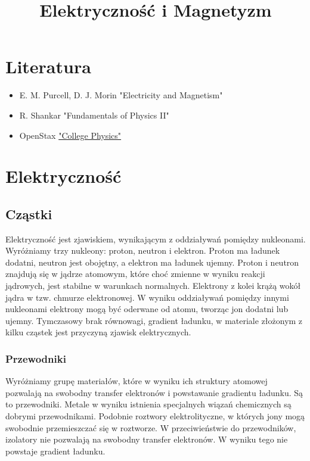 \documentclass{../notatki}
\title{Elektryczność i Magnetyzm}
\begin{document}
\tableofcontents

\section{Literatura}

\begin{itemize}
  \item E. M. Purcell, D. J. Morin "Electricity and Magnetism"
  \item R. Shankar "Fundamentals of Physics II" 
  \item OpenStax
    \href{https://assets.openstax.org/oscms-prodcms/media/documents/College_Physics_2e-WEB_7Zesafu.pdf#%5B%7B%22num%22%3A2876%2C%22gen%22%3A0%7D%2C%7B%22name%22%3A%22XYZ%22%7D%2C0%2C734%2C0%5D}{"College
    Physics"} 
\end{itemize}

\section{Elektryczność}

\subsection{Cząstki}

Elektryczność jest zjawiskiem, wynikającym z oddziaływań pomiędzy nukleonami.
Wyróżniamy trzy nukleony: proton, neutron i elektron. Proton ma ładunek dodatni,
neutron jest obojętny, a elektron ma ładunek ujemny. Proton i neutron znajdują
się w jądrze atomowym, które choć zmienne w wyniku reakcji jądrowych, jest
stabilne w warunkach normalnych. Elektrony z kolei krążą wokół jądra w tzw.
chmurze elektronowej. W wyniku oddziaływań pomiędzy innymi nukleonami elektrony
mogą być oderwane od atomu, tworząc jon dodatni lub ujemny. Tymczasowy brak
równowagi, gradient ładunku, w materiale złożonym z kilku cząstek
jest przyczyną zjawisk elektrycznych.

\subsubsection{Przewodniki}

Wyróżniamy grupę materiałów, które w wyniku ich struktury atomowej pozwalają na
swobodny transfer elektronów i powstawanie gradientu ładunku. Są to przewodniki.
Metale w wyniku istnienia specjalnych wiązań chemicznych są dobrymi
przewodnikami.
Podobnie roztwory elektrolityczne, w których jony mogą swobodnie
przemieszczać się
w roztworze. W przeciwieństwie do przewodników, izolatory nie
pozwalają na swobodny
transfer elektronów. W wyniku tego nie powstaje gradient ładunku.
\end{document}
